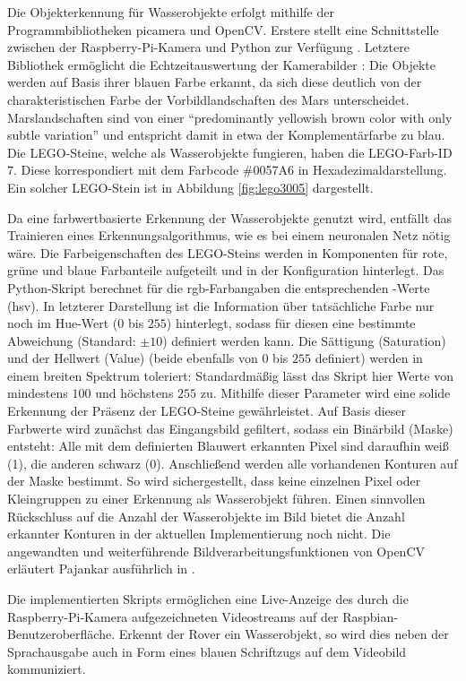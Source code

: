 Die Objekterkennung für Wasserobjekte erfolgt mithilfe der Programmbibliotheken picamera und OpenCV.
Erstere stellt eine Schnittstelle zwischen der Raspberry-Pi-Kamera und Python zur Verfügung \cite{cox2014}.
Letztere Bibliothek ermöglicht die Echtzeitauswertung der Kamerabilder \cite{pajankar2015}:
Die Objekte werden auf Basis ihrer blauen Farbe erkannt, da sich diese deutlich von der charakteristischen Farbe der Vorbildlandschaften des Mars unterscheidet.
Marslandschaften sind von einer \enquote{predominantly yellowish brown color with only subtle variation} \cite[S. 1]{maki1999} und entspricht damit in etwa der Komplementärfarbe zu blau.
Die LEGO-Steine, welche als Wasserobjekte fungieren, haben die LEGO-Farb-ID $7$.
Diese korrespondiert mit dem Farbcode \#0057A6 in Hexadezimaldarstellung.
Ein solcher LEGO-Stein ist in Abbildung \ref{fig:lego3005} dargestellt.

Da eine farbwertbasierte Erkennung der Wasserobjekte genutzt wird, entfällt das Trainieren eines Erkennungsalgorithmus, wie es bei einem neuronalen Netz nötig wäre.
Die Farbeigenschaften des LEGO-Steins werden in Komponenten für rote, grüne und blaue Farbanteile aufgeteilt und in der Konfiguration hinterlegt.
Das Python-Skript berechnet für die \acs{rgb}-Farbangaben die entsprechenden -Werte (\acl{hsv}).
In letzterer Darstellung ist die Information über tatsächliche Farbe nur noch im Hue-Wert ($0$ bis $255$) hinterlegt, sodass für diesen eine bestimmte Abweichung (Standard: $\pm 10$) definiert werden kann.
Die Sättigung (Saturation) und der Hellwert (Value) (beide ebenfalls von $0$ bis $255$ definiert) werden in einem breiten Spektrum toleriert:
Standardmäßig lässt das Skript hier Werte von mindestens $100$ und höchstens $255$ zu.
Mithilfe dieser Parameter wird eine solide Erkennung der Präsenz der LEGO-Steine gewährleistet.
Auf Basis dieser Farbwerte wird zunächst das Eingangsbild gefiltert, sodass ein Binärbild (Maske) entsteht:
Alle mit dem definierten Blauwert erkannten Pixel sind daraufhin weiß (1), die anderen schwarz (0).
Anschließend werden alle vorhandenen Konturen auf der Maske bestimmt.
So wird sichergestellt, dass keine einzelnen Pixel oder Kleingruppen zu einer Erkennung als Wasserobjekt führen.
Einen sinnvollen Rückschluss auf die Anzahl der Wasserobjekte im Bild bietet die Anzahl erkannter Konturen in der aktuellen Implementierung noch nicht.
Die angewandten und weiterführende Bildverarbeitungsfunktionen von OpenCV erläutert Pajankar ausführlich in \cite{pajankar2015}.

Die implementierten Skripts ermöglichen eine Live-Anzeige des durch die Raspberry-Pi-Kamera aufgezeichneten Videostreams auf der Raspbian-Benutzeroberfläche.
Erkennt der Rover ein Wasserobjekt, so wird dies neben der Sprachausgabe auch in Form eines blauen Schriftzugs auf dem Videobild kommuniziert.